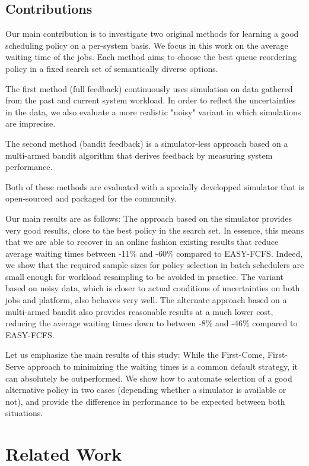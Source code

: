 \documentclass[sigconf,anonymous]{acmart}
\begin{document}
\subsection{Contributions}

Our main contribution is to investigate two original methods for learning a
good scheduling policy on a per-system basis. We focus in this work on the
average waiting time of the jobs. Each method aims to choose the best queue
reordering policy in a fixed search set of semantically diverse options.

The first method (full feedback) continuously uses simulation on data gathered
from the past and current system workload. In order to reflect the
uncertainties in the data, we also evaluate a more realistic "noisy" variant in
which simulations are imprecise.

The second method (bandit feedback) is a simulator-less approach based on a
multi-armed bandit algorithm that derives feedback by measuring system
performance.

Both of these methods are evaluated with a specially developped simulator that is
open-sourced and packaged for the community.


Our main results are as follows: The approach based on the simulator provides
very good results, close to the best policy in the search set. In essence, this
means that we are able to recover in an online fashion existing results that
reduce average waiting times between -11\% and -60\% compared to EASY-FCFS.
Indeed, we show that the required sample sizes for policy selection in batch
schedulers are small enough for workload resampling to be avoided in practice.
The variant based on noisy data, which is closer to actual conditions of
uncertainties on both jobs and platform, also behaves very well. The alternate
approach based on a multi-armed bandit also provides reasonable results at a
much lower cost, reducing the average waiting times down to between -8\% and
-46\% compared to EASY-FCFS.

Let us emphasize the main results of this study: While the First-Come,
First-Serve approach to minimizing the waiting times is a common default
strategy, it can absolutely be outperformed.  We show how to automate selection
of a good alternative policy in two cases (depending whether a simulator is
available or not), and provide the difference in performance to be expected
between both situations.

\section{Related Work}
\label{sec:rw}
\end{document}
